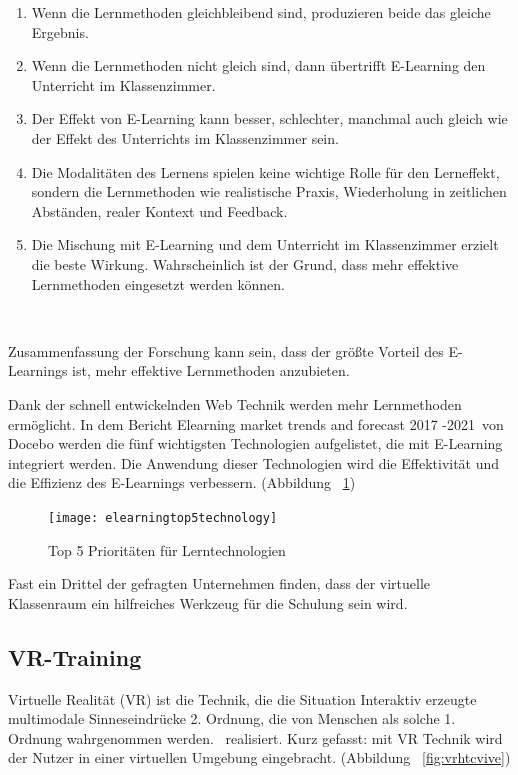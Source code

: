 \begin{enumerate}
\item Wenn die Lernmethoden gleichbleibend sind, produzieren beide das gleiche Ergebnis.
\item Wenn die Lernmethoden nicht gleich sind, dann übertrifft E-Learning den Unterricht im Klassenzimmer.
\item Der Effekt von E-Learning kann besser, schlechter, manchmal auch gleich wie der Effekt des Unterrichts im Klassenzimmer sein.
\item Die Modalitäten des Lernens spielen keine wichtige Rolle für den Lerneffekt, sondern die Lernmethoden wie realistische Praxis, Wiederholung in zeitlichen Abständen, realer Kontext und Feedback.
\item Die Mischung mit E-Learning und dem Unterricht im Klassenzimmer erzielt die beste Wirkung. Wahrscheinlich ist der Grund, dass mehr effektive Lernmethoden eingesetzt werden können. 
\end{enumerate}\

Zusammenfassung der Forschung kann sein, dass der größte Vorteil des E-Learnings ist, mehr effektive Lernmethoden anzubieten.

Dank der schnell entwickelnden Web Technik werden mehr Lernmethoden ermöglicht. In dem Bericht \glqq Elearning market trends and forecast 2017 -2021\grqq\ von Docebo werden die fünf wichtigsten Technologien aufgelistet, die mit E-Learning integriert werden. Die Anwendung dieser Technologien wird die Effektivität und die Effizienz des E-Learnings verbessern. (Abbildung ~\ref{fig:elearningtop5technology})

\begin{figure}[ht]
\vspace*{1em}
\centering
\caption{Top 5 Prioritäten für Lerntechnologien}
\texttt{[image: elearningtop5technology]}
\label{fig:elearningtop5technology} 
\end{figure}

Fast ein Drittel der gefragten Unternehmen finden, dass der virtuelle Klassenraum ein hilfreiches Werkzeug für die Schulung sein wird.

 \subsection{VR-Training}
 
Virtuelle Realität (VR) ist die Technik, die die Situation \glqq Interaktiv erzeugte multimodale Sinneseindrücke 2. Ordnung, die von Menschen als solche 1. Ordnung wahrgenommen werden.\grqq\ \citep{9} realisiert. Kurz gefasst: mit VR Technik wird der Nutzer in einer virtuellen Umgebung eingebracht. (Abbildung ~\ref{fig:vrhtcvive})


